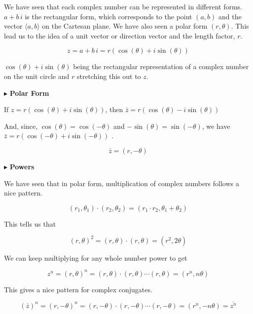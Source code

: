 \documentclass{ximera}
\begin{document}
We have seen that each complex number can be represented in different forms.  $a + b \, i$ is the rectangular form, which corresponds to the point $(a, b)$ and the vector $\langle a, b\rangle$ on the Cartesan plane.  We have also seen a polar form $(r, \theta)$.  This lead us to the idea of a unit vector or direction vector and the length factor, $r$.

\[ z = a + b \, i = r (\cos(\theta) + i \sin(\theta))  \]


$\cos(\theta) + i \sin(\theta)$ being the rectangular representation of a complex number on the unit circle and $r$ stretching this out to $z$.






$\blacktriangleright$ \textbf{Polar Form}

If $z = r (\cos(\theta) + i \sin(\theta))$, then $\bar{z} = r (\cos(\theta) - i \sin(\theta))$

And, since, $\cos(\theta) = \cos(-\theta)$ and $-\sin(\theta) = \sin(-\theta)$, we have $\bar{z} = r (\cos(-\theta) + i \sin(-\theta))$ .


\[   \bar{z} = (r, -\theta) \]




$\blacktriangleright$ \textbf{Powers}



We have seen that in polar form, multiplication of complex numbers follows a nice pattern.


\[   (r_1, \theta_1) \cdot (r_2, \theta_2) = (r_1 \cdot r_2, \theta_1 + \theta_2)                \]



This tells us that 


\[   (r, \theta)^2 =  (r, \theta) \cdot (r, \theta) = (r^2, 2\theta)                \]



We can keep multiplying for any whole number power to get 


\[   z^n = (r, \theta)^n =  (r, \theta) \cdot (r, \theta) \cdots (r, \theta)= (r^n, n\theta)                \]


This gives a nice pattern for complex conjugates.

\[   (\bar{z})^n = (r, -\theta)^n =  (r, -\theta) \cdot (r, -\theta) \cdots (r, -\theta)= (r^n, -n\theta)  = \overline{z^n}              \]
\end{document}

